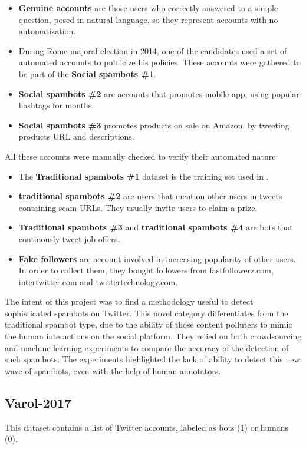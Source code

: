 \normalsize
\begin{itemize}
	\item \textbf{Genuine accounts} are those users who correctly answered to a simple question, posed in natural language, so they represent accounts with no automatization.
	\item  During Rome majoral election in 2014, one of the candidates used a set of automated accounts to publicize his policies. These accounts were gathered to be part of the \textbf{Social spambots \#1}.
	\item \textbf{Social spambots \#2} are accounts that promotes mobile app, using popular hashtags for months.
	\item  \textbf{Social spambots \#3} promotes products on sale on Amazon, by tweeting products URL and descriptions.
\end{itemize}
All these accounts were manually checked to verify their automated nature.

\begin{itemize}
	\item The \textbf{Traditional spambots \#1} dataset is the training set used in \cite{Yang}.
	\item \textbf{traditional spambots \#2} are users that mention other users in tweets containing scam URLs. They usually invite users to claim a prize.
	\item  \textbf{Traditional spambots \#3} and \textbf{traditional spambots \#4} are bots that continously tweet job offers.
	\item \textbf{Fake followers} are account involved in increasing popularity of other users. In order to collect them, they bought followers from fastfollowerz.com, intertwitter.com and twittertechnology.com. \cite{Cresci}
\end{itemize}

The intent of this project was to find a methodology useful to detect sophisticated spambots on Twitter. This novel category differentiates from the traditional spambot type, due to the ability of those content polluters to mimic the human interactions on the social platform. They relied on both crowdsourcing and machine learning experiments to compare the accuracy of the detection of such spambots. The experiments highlighted the lack of ability to detect this new wave of spambots, even with the help of human annotators.


\subsection{Varol-2017}
This dataset contains a list of Twitter accounts, labeled as bots (1) or humans (0).

